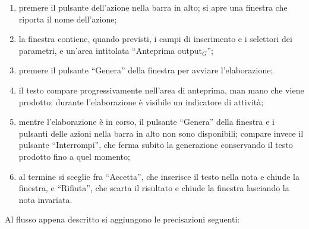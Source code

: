 \documentclass[a4paper, 10pt]{article}
\begin{document}
\begin{enumerate}
    \item premere il pulsante dell'azione nella barra in alto; si apre una finestra che riporta il nome dell'azione;

    \item la finestra contiene, quando previsti, i campi di inserimento e i selettori dei parametri, e un'area intitolata ``Anteprima output$_G$'';

    \item premere il pulsante ``Genera'' della finestra per avviare l'elaborazione;

    \item il testo compare progressivamente nell'area di anteprima, man mano che viene prodotto; durante l'elaborazione è visibile un indicatore di attività;

    \item mentre l'elaborazione è in corso, il pulsante ``Genera'' della finestra e i pulsanti delle azioni nella barra in alto non sono disponibili; compare invece il pulsante ``Interrompi'', che ferma subito la generazione conservando il testo prodotto fino a quel momento;

    \item al termine si sceglie fra ``Accetta'', che inserisce il testo nella nota e chiude la finestra, e ``Rifiuta'', che scarta il risultato e chiude la finestra lasciando la nota invariata.
\end{enumerate}

Al flusso appena descritto si aggiungono le precisazioni seguenti:
\end{document}

